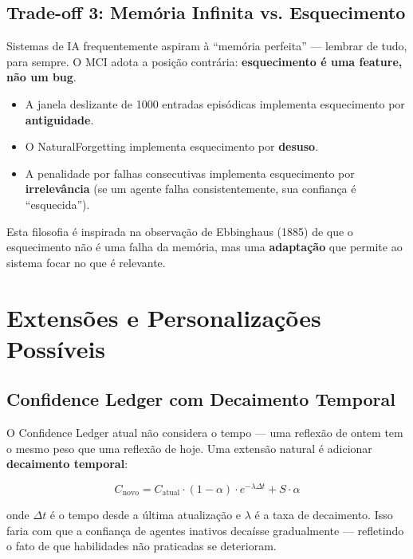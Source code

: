 \subsection{Trade-off 3: Memória Infinita vs. Esquecimento}

Sistemas de IA frequentemente aspiram à ``memória perfeita'' — lembrar de tudo, para sempre. O MCI adota a posição contrária: \textbf{esquecimento é uma feature, não um bug}.

\begin{itemize}
    \item A janela deslizante de 1000 entradas episódicas implementa esquecimento por \textbf{antiguidade}.
    \item O NaturalForgetting implementa esquecimento por \textbf{desuso}.
    \item A penalidade por falhas consecutivas implementa esquecimento por \textbf{irrelevância} (se um agente falha consistentemente, sua confiança é ``esquecida'').
\end{itemize}

Esta filosofia é inspirada na observação de Ebbinghaus (1885) \cite{Ebbinghaus1885_Memory} de que o esquecimento não é uma falha da memória, mas uma \textbf{adaptação} que permite ao sistema focar no que é relevante.

\section{Extensões e Personalizações Possíveis}
\label{sec:extensions}

\subsection{Confidence Ledger com Decaimento Temporal}

O Confidence Ledger atual não considera o tempo — uma reflexão de ontem tem o mesmo peso que uma reflexão de hoje. Uma extensão natural é adicionar \textbf{decaimento temporal}:

\begin{equation}
C_{\text{novo}} = C_{\text{atual}} \cdot (1 - \alpha) \cdot e^{-\lambda \Delta t} + S \cdot \alpha
\end{equation}

onde $\Delta t$ é o tempo desde a última atualização e $\lambda$ é a taxa de decaimento. Isso faria com que a confiança de agentes inativos decaísse gradualmente — refletindo o fato de que habilidades não praticadas se deterioram.

